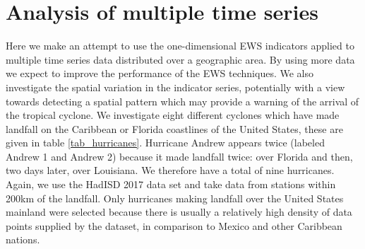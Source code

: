 \documentclass[%
aip,
amsmath,amssymb,
reprint,%
]{revtex4-1}
\begin{document}
\section{Analysis of multiple time series}
\label{sec:MultipleTimeSeries}
Here we make an attempt to use the one-dimensional EWS indicators\cite{prettyman2018} applied to multiple time series data distributed over a geographic area. By using more data we expect to improve the performance of the EWS techniques. We also investigate the spatial variation in the indicator series, potentially with a view towards detecting a spatial pattern which may provide a warning of the arrival of the tropical cyclone.
We investigate eight different cyclones which have made landfall on the Caribbean or Florida coastlines of the United States, these are given in table \ref{tab_hurricanes}. Hurricane Andrew appears twice (labeled Andrew 1 and Andrew 2) because it made landfall twice: over Florida and then, two days later, over Louisiana. We therefore have a total of nine hurricanes. Again, we use the HadISD 2017 data set \cite{HadISD,HadISD_dunn12,HadISD_dunn14,HadISD_dunn16,HadISD_smith} and take data from stations within 200km of the landfall. Only hurricanes making landfall over the United States mainland were selected because there is usually a relatively high density of data points supplied by the dataset, in comparison to Mexico and other Caribbean nations. 
\end{document}
